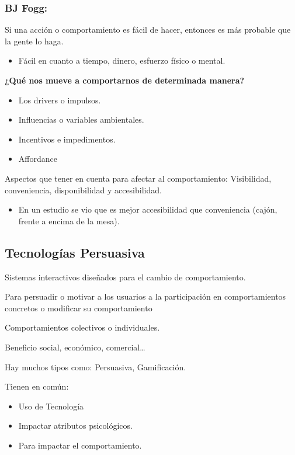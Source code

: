 \documentclass[12pt, twoside, openright]{report} %
\begin{document}
\subsubsection{BJ Fogg:}
Si una acción o comportamiento es fácil de hacer, entonces es más probable que la gente lo haga.
\begin{itemize}
	\item Fácil en cuanto a tiempo, dinero, esfuerzo físico o mental.
\end{itemize}

\textbf{¿Qué nos mueve a comportarnos de determinada manera?}
\begin{itemize}
	\item Los drivers o impulsos.
	\item Influencias o variables ambientales.
	\item Incentivos e impedimentos.
	\item Affordance
\end{itemize}

Aspectos que tener en cuenta para afectar al comportamiento: Visibilidad, conveniencia, disponibilidad y accesibilidad.
\begin{itemize}
	\item En un estudio se vio que es mejor accesibilidad que conveniencia (cajón, frente a encima de la mesa).
\end{itemize}


\subsection{Tecnologías Persuasiva}
Sistemas interactivos diseñados para el cambio de comportamiento.

Para persuadir o motivar a los usuarios a la participación en comportamientos concretos o modificar su comportamiento

Comportamientos colectivos o individuales.

Beneficio social, económico, comercial\dots

Hay muchos tipos como: Persuasiva, Gamificación.

Tienen en común:
\begin{itemize}
	\item Uso de Tecnología
	\item Impactar atributos psicológicos.
	\item Para impactar el comportamiento.
\end{itemize}
\end{document}
